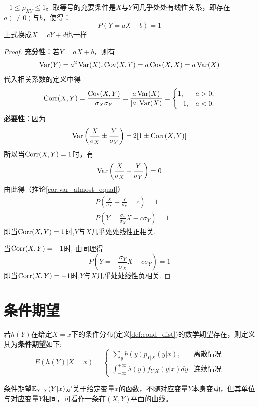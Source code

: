 \begin{proposition}
    $-1 \le \rho_{XY} \le 1$。取等号的充要条件是$X$与$Y$间几乎处处有线性关系，即存在$a(\ne0)$与$b$，使得：
    \[ P(Y=aX+b)=1 \]
    上式换成$X=cY+d$也一样
\end{proposition}
\begin{proof}
    \textbf{充分性}：若$Y=aX+b$，则有
    \[ \operatorname{Var}(Y)=a^2\operatorname{Var}(X),\operatorname{Cov}(X,Y)=a\operatorname{Cov}(X,X)=a\operatorname{Var}(X) \]
    代入相关系数的定义中得
    \[ \operatorname{Corr}(X,Y)=\frac{\operatorname{Cov}(X,Y)}{\sigma_{X}\sigma_{Y}}=\frac{a\operatorname{Var}(X)}{|a|\operatorname{Var}(X)}=\begin{cases}
            1,  & a>0; \\
            -1, & a<0.
        \end{cases} \]
    \textbf{必要性}：因为
    \[ \operatorname{Var}\left( \frac{X}{\sigma_{X}}\pm\frac{Y}{\sigma_{Y}} \right)=2[1\pm\operatorname{Corr}(X,Y)] \]
    所以当$\operatorname{Corr}(X,Y)=1$时，有
    \[ \operatorname{Var}\left( \frac{X}{\sigma_{X}}-\frac{Y}{\sigma_{Y}} \right)=0 \]
    由此得（推论\ref{cor:var_almost_equal}）
    \begin{align*}
         & P\left( \frac{X}{\sigma_{X}}-\frac{Y}{\sigma_{Y}}=c \right)=1  \\
         & P\left( Y=\frac{\sigma_{Y}}{\sigma_{X}}X-c\sigma_{Y} \right)=1
    \end{align*}
    即当$\operatorname{Corr}(X,Y)=1$时,$Y$与$X$几乎处处线性正相关.

    当$\operatorname{Corr}(X,Y)=-1$时, 由同理得
    \[ P\left( Y=-\frac{\sigma_{Y}}{\sigma_{X}}X+c\sigma_{Y} \right)=1 \]
    即当$\operatorname{Corr}(X,Y)=-1$时,$Y$与$X$几乎处处线性负相关.
\end{proof}

\section{条件期望}

\begin{definition}
    若$h(Y)$在给定$X=x$下的条件分布(定义\ref{def:cond_dist})的数学期望存在，则定义其为\textbf{条件期望}如下:
    \[ E(h(Y)|X=x) =\begin{cases}
            \sum_y h(y) p_{Y|X}(y|x),                      & \text{离散情况} \\
            \int_{-\infty}^{+\infty} h(y) f_{Y|X}(y|x) d y & \text{连续情况}
        \end{cases}\]
\end{definition}
\begin{remark}
    条件期望$\mathbb{E}_{Y|X}(Y|x)$是关于给定变量$x$的函数，不随对应变量$Y$本身变动，但其单位与对应变量$Y$相同，可看作一条在$(X,Y)$平面的曲线。
\end{remark}

